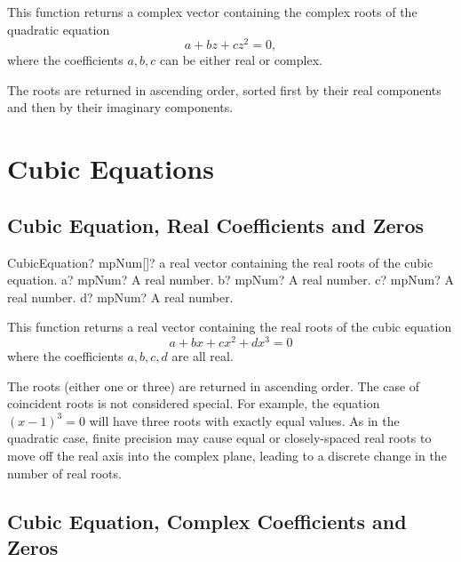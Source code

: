 \vspace{0.3cm}
This function returns  a complex vector containing the complex roots of the quadratic equation
\begin{equation}
a  + b z + c z^2  = 0,
\end{equation}
where the coefficients $a, b, c$ can be either real or complex. 

The roots are returned in ascending order, sorted first by their real components and then by their imaginary components.






\section{Cubic Equations}
\label{CubicEquationsPolynomials}


\subsection{Cubic Equation, Real Coefficients and Zeros}

\begin{mpFunctionsExtract}
	\mpFunctionFour
	{CubicEquation? mpNum[]? a real vector containing the real roots of the cubic equation.}
	{a? mpNum? A real number.}
	{b? mpNum? A real number.}
	{c? mpNum? A real number.}
	{d? mpNum? A real number.}
\end{mpFunctionsExtract}


\vspace{0.3cm}
This function returns a real vector containing the real roots of the cubic equation
\begin{equation}
a  + b x + c x^2 + d x^3  = 0
\end{equation}
where the coefficients $a, b, c, d$ are all real. 

The roots (either one or three) are returned in ascending order. The case of coincident roots is not considered special. For example, the equation $(x-1)^3 = 0$ will have three roots with exactly equal values. As in the quadratic case, finite precision may cause equal or closely-spaced real roots to move off the real axis into the complex plane, leading to a discrete change in the number of real roots.




\subsection{Cubic Equation, Complex Coefficients and Zeros}

